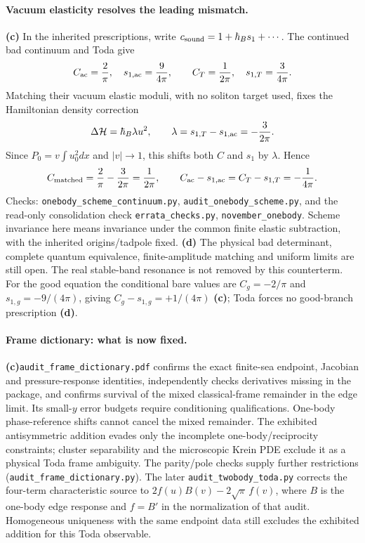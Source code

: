 \documentclass[11pt,a4paper]{article}
\newcommand{\Lc}{\textsf{\textbf{(c)}}\xspace}
\newcommand{\Ld}{\textsf{\textbf{(d)}}\xspace}
\newcommand{\file}[1]{\nolinkurl{#1}}
\theoremstyle{remark}\newtheorem{remark}[proposition]{Remark}
\begin{document}
\paragraph{Vacuum elasticity resolves the leading mismatch.}
\Lc In the inherited prescriptions, write
$c_{\rm sound}=1+\hbar_Bs_1+\cdots$. The continued bad continuum and Toda give
\[
 C_{\rm ac}=\frac2\pi,\quad s_{1,\rm ac}=\frac9{4\pi},\qquad
 C_T=\frac1{2\pi},\quad s_{1,T}=\frac3{4\pi}.
\]
Matching their vacuum elastic moduli, with no soliton target used, fixes the
Hamiltonian density correction
\[
 \Delta\mathcal H=\hbar_B\lambda u^2,\qquad
 \lambda=s_{1,T}-s_{1,\rm ac}=-\frac3{2\pi}.
\]
Since $P_0=v\int u_0^2dx$ and $|v|\to1$, this shifts both $C$ and $s_1$ by
$\lambda$. Hence
\[
 C_{\rm matched}=\frac2\pi-\frac3{2\pi}=\frac1{2\pi},\qquad
 C_{\rm ac}-s_{1,\rm ac}=C_T-s_{1,T}=-\frac1{4\pi}.
\]
Checks: \file{onebody_scheme_continuum.py}, \file{audit_onebody_scheme.py},
and the read-only consolidation check \file{errata_checks.py},
\file{november_onebody}. Scheme invariance here means invariance under the
common finite elastic subtraction, with the inherited origins/tadpole fixed.
\Ld The physical bad determinant, complete quantum equivalence, finite-amplitude
matching and uniform limits are still open. The real stable-band resonance
is not removed by this counterterm. For the good equation the conditional
bare values are $C_g=-2/\pi$ and $s_{1,g}=-9/(4\pi)$, giving
$C_g-s_{1,g}=+1/(4\pi)$ \Lc; Toda forces no good-branch prescription \Ld.

\paragraph{Frame dictionary: what is now fixed.}
\Lc \file{audit_frame_dictionary.pdf} confirms the exact finite-sea endpoint,
Jacobian and pressure-response identities, independently checks derivatives
missing in the package, and confirms survival of the mixed classical-frame
remainder in the edge limit. Its small-$y$ error budgets require conditioning
qualifications. One-body phase-reference shifts cannot cancel the mixed
remainder. The exhibited antisymmetric addition evades only the incomplete
one-body/reciprocity constraints; cluster separability and the microscopic
Krein PDE exclude it as a physical Toda frame ambiguity. The parity/pole
checks supply further restrictions (\file{audit_frame_dictionary.py}).
The later \file{audit_twobody_toda.py} corrects the four-term characteristic
source to $2f(u)B(v)-2\sqrt{\pi}\,f(v)$, where $B$ is the one-body edge
response and $f=B'$ in the normalization of that audit. Homogeneous
uniqueness with the same endpoint data still excludes the exhibited
addition for this Toda observable.
\end{document}
